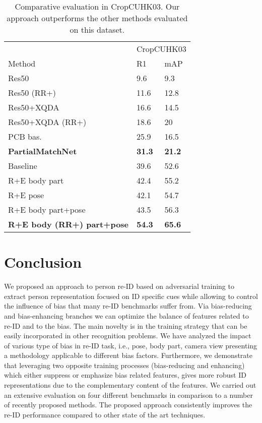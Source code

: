\documentclass[10pt,twocolumn,letterpaper]{article}
\begin{document}
\begin{table}[t]
\centering
\begin{tabular}{lll}
       & \multicolumn{2}{l}{\footnotesize{CropCUHK03}} \\
                 Method            & R1                & mAP                        \\ \hline 
Res50           & 9.6               & 9.3                             \\
Res50 (RR+)    & 11.6              & 12.8                        \\
Res50+XQDA            & 16.6              & 14.5                   \\
Res50+XQDA (RR+)    & 18.6              & 20                          \\
PCB bas.         & 25.9              & 16.5                          \\
\textbf{PartialMatchNet}~\cite{iodice2018partial}    & \textbf{31.3}              & \textbf{21.2}                 \\ \hline
Baseline~\cite{hermans2017defense}             & 39.6             & 52.6                      \\
R+E body part  & 42.4             & 55.2                      \\
R+E pose                  & 42.1              & 54.7                      \\
R+E body part+pose                 & 43.5              & 56.3                         \\
\textbf{R+E body (RR+) part+pose}              & \textbf{54.3}& \textbf{65.6}                          \\
\hline
\end{tabular}
\caption{Comparative evaluation in CropCUHK03. Our approach outperforms  the other methods evaluated on this dataset. }
\label{tab:compcrop}
\end{table}

\section{Conclusion}
We proposed an approach to person re-ID based on adversarial training to extract person representation focused on ID specific cues while allowing to control the influence of bias that many re-ID benchmarks suffer from. Via bias-reducing and bias-enhancing branches we can optimize the balance of features related to re-ID and to the bias. The main novelty is in the training strategy that can be easily incorporated in other recognition problems.
We have analyzed the impact of various type of bias in re-ID task, i.e., pose, body part, camera view presenting a methodology applicable to different bias factors.
Furthermore, we demonstrate that leveraging two opposite training processes (bias-reducing and enhancing) which either suppress or emphasize bias related features, gives more robust ID representations due to the complementary content of the features.
We carried out an extensive evaluation on four different benchmarks in comparison to a number of recently proposed methods. The proposed approach consistently improves the re-ID performance compared to other state of the art techniques.   
\end{document}
